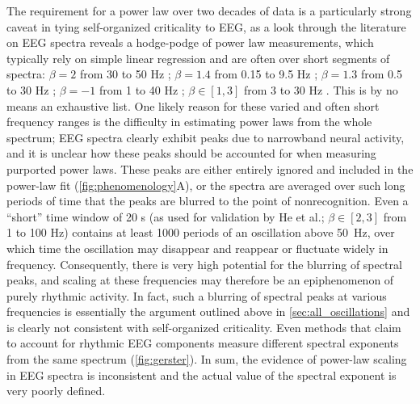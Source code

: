 The requirement for a power law over two decades of data is a particularly strong caveat in tying self-organized criticality to EEG, as a look through the literature on EEG spectra reveals a hodge-podge of power law measurements, which typically rely on simple linear regression and are often over short segments of spectra: $\beta=2$ from 30 to 50 Hz \cite{Lendner2020}; $\beta=1.4$ from 0.15 to 9.5 Hz \cite{Dehghani2010}; $\beta=1.3$ from 0.5 to 30 Hz \cite{Pritchard1992};  $\beta=-1$ from 1 to 40 Hz \cite{Colombo2019}; $\beta\in[1,3]$ from 3 to 30 Hz \cite{Pereda1998}. This is by no means an exhaustive list. One likely reason for these varied and often short frequency ranges is the difficulty in estimating power laws from the whole spectrum; EEG spectra clearly exhibit peaks due to narrowband neural activity, and it is unclear how these peaks should be accounted for when measuring purported power laws. These peaks are either entirely ignored and included in the power-law fit (\autoref{fig:phenomenology}A), or the spectra are averaged over such long periods of time that the peaks are blurred to the point of nonrecognition. Even a ``short'' time window of 20 s (as used for validation by He et al.\cite{He2010}; $\beta\in[2,3]$ from 1 to 100 Hz) contains at least 1000 periods of an oscillation above \qty{50}{\hertz}, over which time the oscillation may disappear and reappear or fluctuate widely in frequency. Consequently, there is very high potential for the blurring of spectral peaks, and scaling at these frequencies may therefore be an epiphenomenon of purely rhythmic activity. In fact, such a blurring of spectral peaks at various frequencies is essentially the argument outlined above in \autoref{sec:all_oscillations} and is clearly not consistent with self-organized criticality. Even methods that claim to account for rhythmic EEG components measure different spectral exponents from the same spectrum (\autoref{fig:gerster}).  In sum, the evidence of power-law scaling in EEG spectra is inconsistent and the actual value of the spectral exponent is very poorly defined. 

